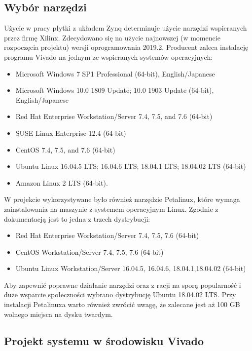 \subsection{Wybór narzędzi}

Użycie w pracy płytki z układem Zynq determinuje użycie narzędzi wspieranych 
przez firmę Xilinx. Zdecydowano się na użycie najnowszej (w momencie rozpoczęcia 
projektu) wersji oprogramowania 2019.2. Producent zaleca \cite{VivadoGuide} instalację 
programu Vivado na jednym ze wspieranych systemów operacyjnych:

\begin{itemize}
  \item Microsoft Windows 7 SP1 Professional (64-bit), English/Japanese 
  \item Microsoft Windows 10.0 1809 Update; 10.0 1903 Update (64-bit), English/Japanese
  \item Red Hat Enterprise Workstation/Server 7.4, 7.5, and 7.6 (64-bit)
  \item SUSE Linux Enterprise 12.4 (64-bit)
  \item CentOS 7.4, 7.5, and 7.6 (64-bit)
  \item Ubuntu Linux 16.04.5 LTS; 16.04.6 LTS; 18.04.1 LTS; 18.04.02 LTS (64-bit)
  \item Amazon Linux 2 LTS (64-bit).
\end{itemize}

\bigskip
W projekcie wykorzystywane było również narzędzie Petalinux, które wymaga 
zainstalowania na maszynie z systemem operacyjnym Linux. Zgodnie z 
dokumentacją \cite{PetalinuxGuide} jest to jedna z trzech dystrybucji:

\begin{itemize}
\item Red Hat Enterprise Workstation/Server 7.4, 7.5, 7.6 (64-bit)
\item CentOS Workstation/Server 7.4, 7.5, 7.6 (64-bit)
\item Ubuntu Linux Workstation/Server 16.04.5, 16.04.6, 18.04.1,18.04.02 (64-bit)
\end{itemize}

\bigskip
Aby zapewnić poprawne działanie narzędzi oraz z racji na sporą popularność i duże 
wsparcie społeczności wybrano dystrybucję Ubuntu 18.04.02 LTS. Przy instalacji 
Petalinuxa warto również zwrócić uwagę, że zalecane jest aż 100 GB wolnego miejsca 
na dysku twardym. 

\subsection{Projekt systemu w środowisku Vivado}

